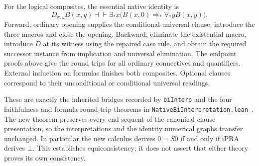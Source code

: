 For the logical composites, the essential native identity is
\[
 D_{x,y}B(x,y)\dashv\vdash
 \exists_*x\bigl(B(x,0)\Rightarrow_*\forall_*y B(x,y)\bigr).
\]
Forward, ordinary opening supplies the conditional-universal clause;
introduce the three macros and close the opening. Backward, eliminate
the existential macro, introduce $D$ at its witness using the repaired
case rule, and obtain the required successor instance from implication
and universal elimination. The endpoint proofs above give the round
trips for all ordinary connectives and quantifiers. External induction
on formulas finishes both composites. Optional clauses correspond to
their unconditional or conditional universal readings.

These are exactly the inherited bridges recorded by
\texttt{biInterp} and the four faithfulness and formula round-trip theorems in
\texttt{NativeBiInterpretation.lean}~\cite{lean}. The new theorem
preserves every end sequent of the canonical clause presentation,
so the interpretations and the identity numerical graphs transfer
unchanged. In particular the new calculus derives $0=S0$ if and
only if iPRA derives $\bot$. This establishes equiconsistency; it
does not assert that either theory proves its own consistency.
